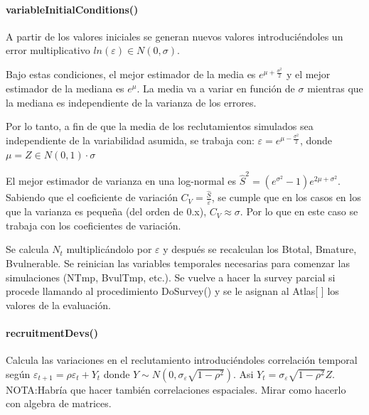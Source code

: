 			\paragraph{variableInitialConditions()}
				A partir de los valores iniciales se generan nuevos valores introduciéndoles un error multiplicativo $ln(\varepsilon) \in N(0,\sigma)$.
				 \par Bajo estas condiciones, el mejor estimador de la media es $e^{\mu+\frac{\sigma^2}{2}}$ y el mejor estimador de la mediana es $e^{\mu}$. La media va a variar en función de $\sigma$ mientras que la mediana es independiente de la varianza de los errores. 
				\par Por lo tanto, a fin de que la media de los reclutamientos simulados sea independiente de la variabilidad asumida, se trabaja con:
				$\varepsilon=e^{\mu-\frac{\sigma^2}{2}}$, 
				donde $\mu= Z\in N(0,1) \cdot \sigma$
				\par El mejor estimador de varianza en una log-normal es $\hat{S}^2=(e^{\sigma^2}-1)e^{2\mu+\sigma^2}$. Sabiendo que el coeficiente de variación $C_V=\frac{\hat{S}}{\bar{\varepsilon}}$, se cumple que en los casos en los que la varianza es pequeña (del orden de 0.x), $C_V \approx \sigma$. Por lo que en este caso se trabaja con los coeficientes de variación.
				\par Se calcula $N_t$ multiplicándolo por $\varepsilon$ y después se recalculan los Btotal, Bmature, Bvulnerable. Se reinician las variables temporales necesarias para comenzar las simulaciones (NTmp, BvulTmp, etc.). Se vuelve a hacer la survey parcial si procede llamando al procedimiento DoSurvey() y se le asignan al Atlas[ ] los valores de la evaluación. 
			
			\paragraph{recruitmentDevs()}
				Calcula las variaciones en el reclutamiento introduciéndoles correlación temporal según $\varepsilon_{t+1}= \rho \varepsilon_t + Y_t$ donde $Y \sim N(0, \sigma_{\varepsilon} \sqrt{1-\rho^2})$. 
				Asi $Y_t= \sigma_{\varepsilon} \sqrt{1-\rho^2} Z$.
				NOTA:Habría que hacer también correlaciones espaciales. Mirar como hacerlo con algebra de matrices.
				
			
